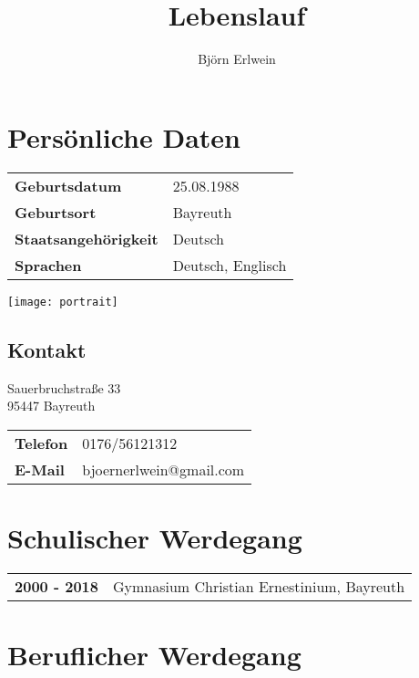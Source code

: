 \documentclass[10pt,ngerman,a4paper]{article}
\title{Lebenslauf}
\author{Björn Erlwein}
\date{\vspace{-5ex}} %
\begin{document}

\maketitle

\section{Persönliche Daten}
\begin{minipage}{0.3\textwidth}
\begin{tabular}{ll}
\textbf{Geburtsdatum} & 25.08.1988\\
\textbf{Geburtsort} & Bayreuth\\
\textbf{Staatsangehörigkeit} & Deutsch\\
\textbf{Sprachen} & Deutsch, Englisch
\end{tabular}
\end{minipage}
\begin{minipage}{0.6\textwidth}
\flushright
\texttt{[image: portrait]}
\end{minipage}
\subsection{Kontakt}

Sauerbruchstraße 33\\
95447 Bayreuth

\begin{tabular}{ll}
\textbf{Telefon} & 0176/56121312\\
\textbf{E-Mail} & bjoernerlwein@gmail.com
\end{tabular}

\section{Schulischer Werdegang}

\begin{tabular}{ll}
\textbf{2000 - 2018} & Gymnasium Christian Ernestinium, Bayreuth
\end{tabular}

\section{Beruflicher Werdegang}
\end{document}
